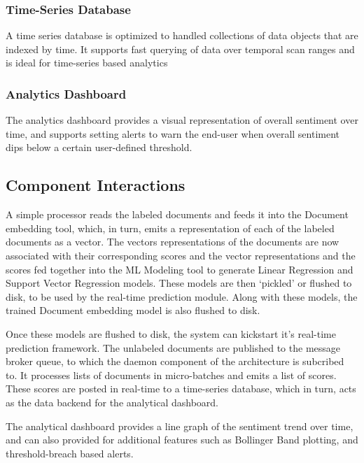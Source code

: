 \documentclass[conference]{IEEEtran}
\begin{document}
\subsubsection{Time-Series Database}
A time series database is optimized to handled collections of data objects that are indexed by time. 
It supports fast querying of data over temporal scan ranges and is ideal for time-series based analytics

\subsubsection{Analytics Dashboard}
The analytics dashboard provides a visual representation of overall sentiment over time, and supports setting alerts to warn the end-user when overall sentiment dips below a certain user-defined threshold.

\subsection{Component Interactions} \label{Component Interactions}
A simple processor reads the labeled documents and feeds it into the Document embedding tool, which, in turn, emits a representation of each of the labeled documents as a vector.
The vectors representations of the documents are now associated with their corresponding scores and the vector representations and the scores fed together into the ML Modeling tool to generate Linear Regression and Support Vector Regression models. 
These models are then `pickled' or flushed to disk, to be used by the real-time prediction module. 
Along with these models, the trained Document embedding model is also flushed to disk.

Once these models are flushed to disk, the system can kickstart it's real-time prediction framework. 
The unlabeled documents are published to the message broker queue, to which the daemon component of the architecture is subcribed to. 
It processes lists of documents in micro-batches and emits a list of scores. 
These scores are posted in real-time to a time-series database, which in turn, acts as the data backend for the analytical dashboard.

The analytical dashboard provides a line graph of the sentiment trend over time, and can also provided for additional features such as Bollinger Band plotting, and threshold-breach based alerts.
\end{document}
